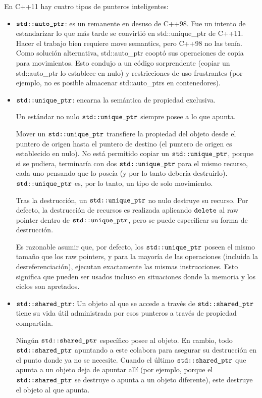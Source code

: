 \documentclass[10pt]{article}
\begin{document}
En C++11 hay cuatro tipos de punteros inteligentes:
\begin{itemize}
	\item $ \verb*|std::auto_ptr| $: es un remanente en desuso de C++98. Fue un intento de estandarizar lo que más tarde se convirtió en std::unique\_ptr de C++11. Hacer el trabajo bien requiere move semantics, pero C++98 no las tenía. Como solución alternativa, std::auto\_ptr cooptó sus operaciones de copia para movimientos. Esto condujo a un código sorprendente (copiar un std::auto\_ptr lo establece en nulo) y restricciones de uso frustrantes (por ejemplo, no es posible almacenar std::auto\_ptrs en contenedores). 
	\item $ \verb*|std::unique_ptr| $: encarna la semántica de propiedad exclusiva. 
	
	Un estándar no nulo $ \verb*|std::unique_ptr| $ siempre posee a lo que apunta.
	
	Mover un $ \verb*|std::unique_ptr| $ transfiere la propiedad del objeto desde el puntero de origen hasta el puntero de destino (el puntero de origen es establecido en nulo). No está permitido copiar un $ \verb*|std::unique_ptr| $, porque si se pudiera, terminaría con dos $ \verb*|std::unique_ptr| $ para el mismo recurso,
	cada uno pensando que lo pose\'ia (y por lo tanto debería destruirlo). $ \verb*|std::unique_ptr| $ es, por lo tanto, un tipo de solo movimiento. 
	
	Tras la destrucción, un $ \verb*|std::unique_ptr| $ no nulo destruye su recurso. Por defecto, la destrucción de recursos es realizada aplicando $ \verb*|delete| $ al raw pointer dentro de $ \verb*|std::unique_ptr| $, pero se puede especificar su forma de destrucci\'on.
	
	Es razonable asumir que, por defecto, los $ \verb*|std::unique_ptr| $ poseen el mismo tamaño que los raw pointers, y para la mayoría de las operaciones (incluida la desreferenciación), ejecutan exactamente las mismas instrucciones. Esto significa que pueden ser usados incluso en situaciones donde la memoria y los ciclos son apretados. 
	
	\item $ \verb*|std::shared_ptr| $: Un objeto al que se accede a través de $ \verb*|std::shared_ptr| $ tiene su vida útil administrada por esos punteros a través de propiedad compartida. 
	
	Ningún $ \verb*|std::shared_ptr| $ específico posee al objeto. En cambio, todo $ \verb*|std::shared_ptr| $ apuntando a este colabora para asegurar su destrucción en el punto donde ya no se necesite. Cuando el último $ \verb*|std::shared_ptr| $ que apunta a un objeto deja de apuntar allí (por ejemplo, porque el $ \verb*|std::shared_ptr| $ se destruye o apunta a un objeto diferente), este destruye el objeto al que apunta. 
	

\end{itemize}
\end{document}
